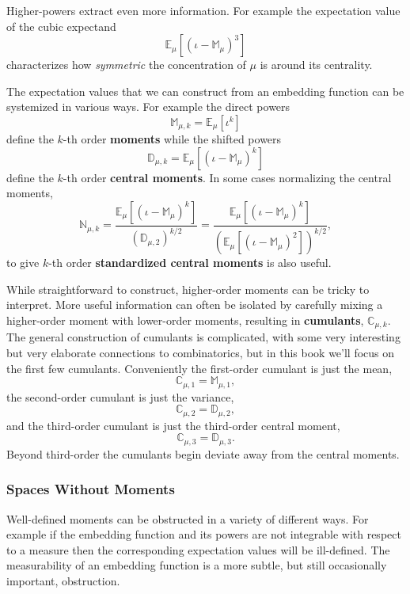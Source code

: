 \documentclass[
  letterpaper,
  DIV=11,
  numbers=noendperiod]{scrartcl}
\begin{document}
Higher-powers extract even more information. For example the expectation
value of the cubic expectand \[
\mathbb{E}_{\mu} \left[ (\iota - \mathbb{M}_{\mu})^{3} \right]
\] characterizes how \emph{symmetric} the concentration of \(\mu\) is
around its centrality.

The expectation values that we can construct from an embedding function
can be systemized in various ways. For example the direct powers \[
\mathbb{M}_{\mu, k} = \mathbb{E}_{\mu} \left[ \iota^{k} \right]
\] define the \(k\)-th order \textbf{moments} while the shifted powers
\[
\mathbb{D}_{\mu, k} =
\mathbb{E}_{\mu} \left[ (\iota - \mathbb{M}_{\mu})^{k} \right]
\] define the \(k\)-th order \textbf{central moments}. In some cases
normalizing the central moments, \[
\mathbb{N}_{\mu, k} =
\frac{ \mathbb{E}_{\mu} \left[ (\iota - \mathbb{M}_{\mu})^{k} \right] }
{ (\mathbb{D}_{\mu, 2})^{k / 2} }
=
\frac{ \mathbb{E}_{\mu} \left[ (\iota - \mathbb{M}_{\mu})^{k} \right] }
{ \left(
    \mathbb{E}_{\mu} \left[ (\iota - \mathbb{M}_{\mu})^{2} \right]
  \right)^{k / 2} },
\] to give \(k\)-th order \textbf{standardized central moments} is also
useful.

While straightforward to construct, higher-order moments can be tricky
to interpret. More useful information can often be isolated by carefully
mixing a higher-order moment with lower-order moments, resulting in
\textbf{cumulants}, \(\mathbb{C}_{\mu, k}\). The general construction of
cumulants is complicated, with some very interesting but very elaborate
connections to combinatorics, but in this book we'll focus on the first
few cumulants. Conveniently the first-order cumulant is just the mean,
\[
\mathbb{C}_{\mu, 1} = \mathbb{M}_{\mu, 1},
\] the second-order cumulant is just the variance, \[
\mathbb{C}_{\mu, 2} = \mathbb{D}_{\mu, 2},
\] and the third-order cumulant is just the third-order central moment,
\[
\mathbb{C}_{\mu, 3} = \mathbb{D}_{\mu, 3}.
\] Beyond third-order the cumulants begin deviate away from the central
moments.

\hypertarget{spaces-without-moments}{%
\subsubsection{Spaces Without Moments}\label{spaces-without-moments}}

Well-defined moments can be obstructed in a variety of different ways.
For example if the embedding function and its powers are not integrable
with respect to a measure then the corresponding expectation values will
be ill-defined. The measurability of an embedding function is a more
subtle, but still occasionally important, obstruction.
\end{document}
